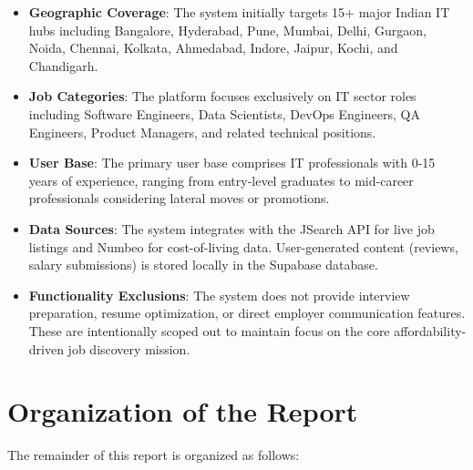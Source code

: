 \documentclass[12pt,a4paper,oneside]{report}
\begin{document}
\begin{itemize}
    \item \textbf{Geographic Coverage}: The system initially targets 15+ major Indian IT hubs including Bangalore, Hyderabad, Pune, Mumbai, Delhi, Gurgaon, Noida, Chennai, Kolkata, Ahmedabad, Indore, Jaipur, Kochi, and Chandigarh.
    
    \item \textbf{Job Categories}: The platform focuses exclusively on IT sector roles including Software Engineers, Data Scientists, DevOps Engineers, QA Engineers, Product Managers, and related technical positions.
    
    \item \textbf{User Base}: The primary user base comprises IT professionals with 0-15 years of experience, ranging from entry-level graduates to mid-career professionals considering lateral moves or promotions.
    
    \item \textbf{Data Sources}: The system integrates with the JSearch API for live job listings and Numbeo for cost-of-living data. User-generated content (reviews, salary submissions) is stored locally in the Supabase database.
    
    \item \textbf{Functionality Exclusions}: The system does not provide interview preparation, resume optimization, or direct employer communication features. These are intentionally scoped out to maintain focus on the core affordability-driven job discovery mission.
\end{itemize}

\section{Organization of the Report}

The remainder of this report is organized as follows:
\end{document}
